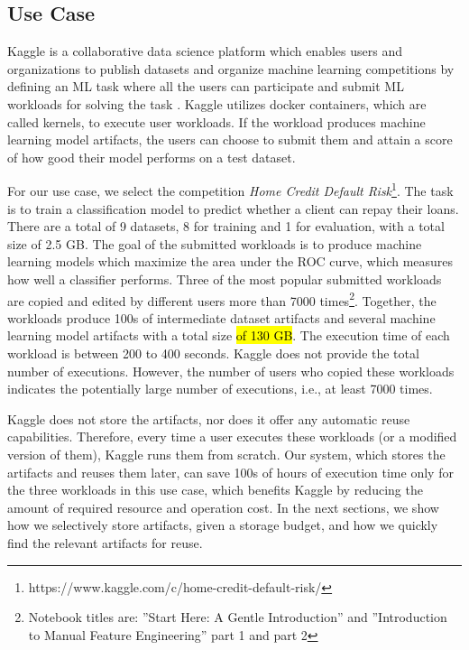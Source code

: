 \subsection{Use Case}\label{subsec-motivational-example}
Kaggle is a collaborative data science platform which enables users and organizations to publish datasets and organize machine learning competitions by defining an ML task where all the users can participate and submit ML workloads for solving the task \cite{kagglewebsite}.
Kaggle utilizes docker containers, which are called kernels, to execute user workloads.
If the workload produces machine learning model artifacts, the users can choose to submit them and attain a score of how good their model performs on a test dataset.

For our use case, we select the competition \textit{Home Credit Default Risk}\footnote{https://www.kaggle.com/c/home-credit-default-risk/}.
The task is to train a classification model to predict whether a client can repay their loans.
There are a total of 9 datasets, 8 for training and 1 for evaluation, with a total size of 2.5 GB.
The goal of the submitted workloads is to produce machine learning models which maximize the area under the ROC curve, which measures how well a classifier performs.
Three of the most popular submitted workloads are copied and edited by different users more than 7000 times\footnote{Notebook titles are: ''Start Here: A Gentle Introduction'' and ''Introduction to Manual Feature Engineering'' part 1 and part 2}.
Together, the workloads produce 100s of intermediate dataset artifacts and several machine learning model artifacts with a total size \hl{of 130 GB}.
The execution time of each workload is between 200 to 400 seconds.
Kaggle does not provide the total number of executions.
However, the number of users who copied these workloads indicates the potentially large number of executions, i.e., at least 7000 times.

Kaggle does not store the artifacts, nor does it offer any automatic reuse capabilities.
Therefore, every time a user executes these workloads (or a modified version of them), Kaggle runs them from scratch.
Our system, which stores the artifacts and reuses them later, can save 100s of hours of execution time only for the three workloads in this use case, which benefits Kaggle by reducing the amount of required resource and operation cost.
In the next sections, we show how we selectively store artifacts, given a storage budget, and how we quickly find the relevant artifacts for reuse.